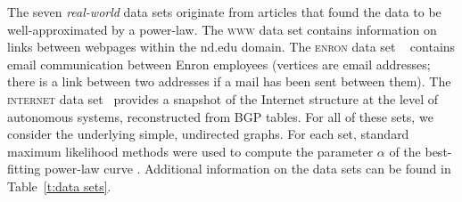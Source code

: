The seven \emph{real-world} data sets originate  from articles that found the data to be well-approximated by a power-law. 
The \textsc{www} data set  \cite{albert1999internet} contains information on links between webpages within the nd.edu domain. 
The \textsc{enron} data set ~\cite{leskovec2009community}  contains email communication between  Enron employees (vertices are email addresses; there is a link between two addresses
if a mail has been sent between them).
The \textsc{internet} data set~\cite{newman} provides a snapshot of the Internet structure at the level of  autonomous systems, reconstructed from BGP tables. 
For all of these sets, we consider the underlying simple, undirected graphs. For each set, standard maximum likelihood methods were used to compute the parameter
$\alpha$ of the best-fitting power-law curve \cite{clauset2009power}. Additional information on the data sets can be found in Table~\ref{t:data sets}.

